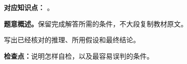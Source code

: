 

\textbf{对应知识点：}
。

\textbf{题意概述。}保留完成解答所需的条件，不大段复制教材原文。

\begin{checkedsolution}
写出已经核对的推理、所用假设和最终结论。
\end{checkedsolution}

\textbf{检查点：}说明怎样自检，以及最容易误判的条件。
